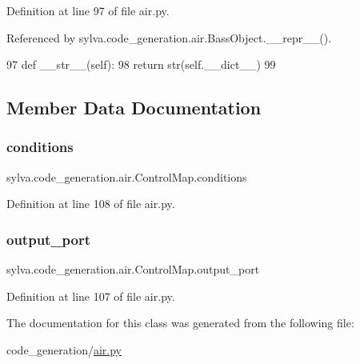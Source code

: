 Definition at line 97 of file air.\+py.



Referenced by sylva.\+code\+\_\+generation.\+air.\+Bass\+Object.\+\_\+\+\_\+repr\+\_\+\+\_\+().


\begin{DoxyCode}
97     \textcolor{keyword}{def }\_\_str\_\_(self):
98         \textcolor{keywordflow}{return} str(self.\_\_dict\_\_)
99 
\end{DoxyCode}


\subsection{Member Data Documentation}
\mbox{\label{classsylva_1_1code__generation_1_1air_1_1_control_map_ada7c102a2016403651c51193ba94dbc7}} 
\subsubsection{\texorpdfstring{conditions}{conditions}}
{\footnotesize\ttfamily sylva.\+code\+\_\+generation.\+air.\+Control\+Map.\+conditions}



Definition at line 108 of file air.\+py.

\mbox{\label{classsylva_1_1code__generation_1_1air_1_1_control_map_ab1eb2dd172ed3e35b4d93645aca8b340}} 
\subsubsection{\texorpdfstring{output\+\_\+port}{output\_port}}
{\footnotesize\ttfamily sylva.\+code\+\_\+generation.\+air.\+Control\+Map.\+output\+\_\+port}



Definition at line 107 of file air.\+py.



The documentation for this class was generated from the following file\+:\begin{DoxyCompactItemize}
\item 
code\+\_\+generation/\hyperlink{air_8py}{air.\+py}\end{DoxyCompactItemize}
